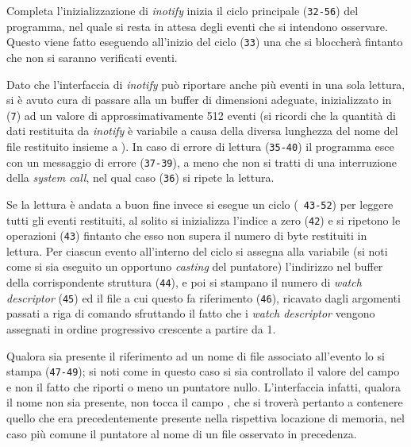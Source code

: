 Completa l'inizializzazione di \textit{inotify} inizia il ciclo principale
(\texttt{\small 32-56}) del programma, nel quale si resta in attesa degli
eventi che si intendono osservare. Questo viene fatto eseguendo all'inizio del
ciclo (\texttt{\small 33}) una  che si bloccherà fintanto che non
si saranno verificati eventi.

Dato che l'interfaccia di \textit{inotify} può riportare anche più eventi in
una sola lettura, si è avuto cura di passare alla  un buffer di
dimensioni adeguate, inizializzato in (\texttt{\small 7}) ad un valore di
approssimativamente 512 eventi (si ricordi che la quantità di dati restituita
da \textit{inotify} è variabile a causa della diversa lunghezza del nome del
file restituito insieme a ). In caso di errore di
lettura (\texttt{\small 35-40}) il programma esce con un messaggio di errore
(\texttt{\small 37-39}), a meno che non si tratti di una interruzione della
\textit{system call}, nel qual caso (\texttt{\small 36}) si ripete la lettura.

Se la lettura è andata a buon fine invece si esegue un ciclo (\texttt{\small
  43-52}) per leggere tutti gli eventi restituiti, al solito si inizializza
l'indice  a zero (\texttt{\small 42}) e si ripetono le operazioni
(\texttt{\small 43}) fintanto che esso non supera il numero di byte restituiti
in lettura. Per ciascun evento all'interno del ciclo si assegna alla variabile
 (si noti come si sia eseguito un opportuno \textit{casting} del
puntatore) l'indirizzo nel buffer della corrispondente struttura
 (\texttt{\small 44}), e poi si stampano il numero di
\textit{watch descriptor} (\texttt{\small 45}) ed il file a cui questo fa
riferimento (\texttt{\small 46}), ricavato dagli argomenti passati a riga di
comando sfruttando il fatto che i \textit{watch descriptor} vengono assegnati
in ordine progressivo crescente a partire da 1.

Qualora sia presente il riferimento ad un nome di file associato all'evento lo
si stampa (\texttt{\small 47-49}); si noti come in questo caso si sia
controllato il valore del campo  e non il fatto che
 riporti o meno un puntatore nullo. L'interfaccia infatti,
qualora il nome non sia presente, non tocca il campo , che
si troverà pertanto a contenere quello che era precedentemente presente nella
rispettiva locazione di memoria, nel caso più comune il puntatore al nome di
un file osservato in precedenza.

